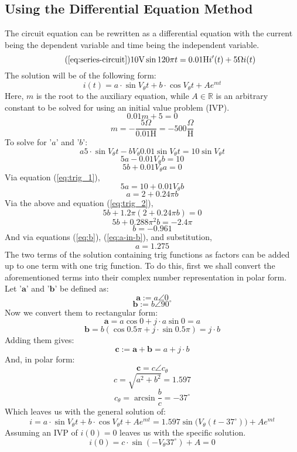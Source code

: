 \documentclass{article}
\begin{document}
	\subsection[DiffEq.]{Using the Differential Equation Method}
	The circuit equation can be rewritten as a differential equation with the 
	current being the dependent variable and time being the independent 
	variable.
	\begin{equation}\tag{\ref{eq:series-circuit}}
		10\text{V}\sin 120\pi t = 0.01\text{H}i'(t) + 5\Omega i(t)
	\end{equation}
	The solution will be of the following form:
	$$ i(t) = a\cdot\sin V_\theta t + b\cdot\cos V_\theta t + Ae^{mt}$$
	Here, $m$ is the root to the auxiliary equation, while $A \in \mathbb{R}$ 
	is an arbitrary constant to be solved for using an initial value problem 
	(IVP).
	$$ 0.01m + 5 = 0$$
	\begin{equation}\label{eq:m}
		m = -\frac{5\Omega}{0.01\text{H}} = -500 \frac{\Omega}{\text{H}}
	\end{equation}
	To solve for '$a$' and '$b$':
	$$ a5\cdot\sin V_\theta t - bV_\theta0.01\sin V_\theta t = 
	10\sin V_\theta t$$
	\begin{equation}\label{eq:trig_1}
		5 a - 0.01 V_\theta b = 10
	\end{equation}
	\begin{equation}\label{eq:trig_2}
		5 b + 0.01 V_\theta a = 0
	\end{equation}
	Via equation (\ref{eq:trig_1}),
	$$ 5a = 10 + 0.01V_\theta b$$
	\begin{equation}\label{eq:a-in-b}
		a = 2 + 0.24\pi b
	\end{equation}
	Via the above and equation (\ref{eq:trig_2}),
	$$ 5b + 1.2\pi (2+0.24\pi b) = 0$$
	$$ 5b + 0.288\pi^2b = - 2.4\pi$$
	\begin{equation}\label{eq:b}
		b = -0.961
	\end{equation}
	And via equations (\ref{eq:b}), (\ref{eq:a-in-b}), and substitution,
	\begin{equation}\label{eq:a}
		a = 1.275
	\end{equation}
	The two terms of the solution containing trig functions as factors can be 
	added up to one term with one trig function.  To do this, first we shall 
	convert the aforementioned terms into their complex number representation 
	in polar form.  Let '$\mathbf{a}$' and '$\mathbf{b}$' be defined as:
	$$ \mathbf{a} := a\angle0$$
	$$ \mathbf{b} := b\angle90^{\circ}$$
	Now we convert them to rectangular form:
	$$ \mathbf{a} = a\cos 0 + j\cdot a\sin0 = a$$
	$$ \mathbf{b} = b(\cos0.5\pi + j \cdot \sin 0.5\pi) = j \cdot b $$
	Adding them gives:
	$$ \mathbf{c}:=\mathbf{a} + \mathbf{b} = a + j\cdot b$$
	And, in polar form:
	$$ \mathbf{c} = c\angle c_\theta$$
	$$ c = \sqrt{a^2 + b^2} = 1.597$$
	$$ c_\theta = \arcsin \frac{b}{c} = -37^{\circ}$$
	Which leaves us with the general solution of:
	\begin{equation}\label{eq:general-i}
		i = a \cdot \sin V_\theta t + b \cdot \cos V_\theta t + Ae^{mt} = 1.597 
		\sin \big(V_\theta (t - 37^{\circ}) \big) + A e^{mt}
	\end{equation}
	Assuming an IVP of $i(0)=0$ leaves us with the specific solution.
	$$ i(0) = c\cdot\sin(-V_\theta37^{\circ}) + A = 0$$
\end{document}
